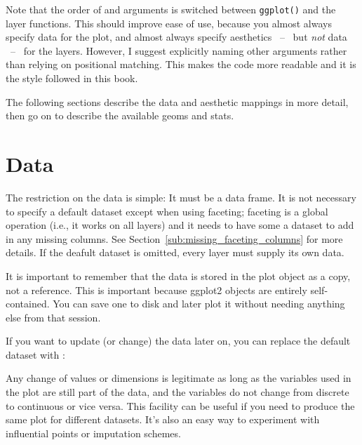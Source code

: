 % 

Note that the order of  and  arguments is switched between {\tt ggplot()} and the layer functions.  This should improve ease of use, because you almost always specify data for the plot, and almost always specify aesthetics ~--~ but {\em not} data ~--~ for the layers.  However, I suggest explicitly naming other arguments rather than relying on positional matching.  This makes the code more readable and it is the style followed in this book.

The following sections describe the data and aesthetic mappings in more detail, then go on to describe the available geoms and stats.

\section{Data}
\label{sec:data}

The restriction on the data is simple: It must be a data frame.  It is not necessary to specify a default dataset except when using faceting; faceting is a global operation (i.e., it works on all layers) and it needs to have some a dataset to add in any missing columns.  See Section~\ref{sub:missing_faceting_columns} for more details.  If the deafult dataset is omitted, every layer must supply its own data.

It is important to remember that the data is stored in the plot object as a copy, not a reference.  This is important because ggplot2 objects are entirely self-contained.  You can save one to disk and later plot it without needing anything else from that session.

If you want to update (or change) the data later on, you can replace the default dataset with \code{\%+\%}:

% 


\noindent Any change of values or dimensions is legitimate as long as the variables used in the plot are still part of the data, and the variables do not change from discrete to continuous or vice versa.  This facility can be useful if you need to produce the same plot for different datasets.  It's also an easy way to experiment with influential points or imputation schemes.

